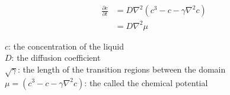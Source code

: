 \documentclass[12pt, letterpaper]{article}
\begin{document}
\begin{singlespace}
  \begin{equation}\label{eq:cahnHilliard}
    \begin{split}
      \frac{\partial c}{\partial t} &= D \nabla^2 (c^3 -c -\gamma \nabla^2 c) \\
                                    &= D \nabla^2 \mu 
    \end{split}
  \end{equation}
  \begin{small}
$c$: the concentration of the liquid \\
$D$: the diffusion coefficient \\
$\sqrt{\gamma}$: the length of the transition regions between the domain \\
$\mu = (c^3 - c -\gamma \nabla^2 c)$: the called the chemical potential 
  \end{small}
\end{singlespace}
\end{document}
